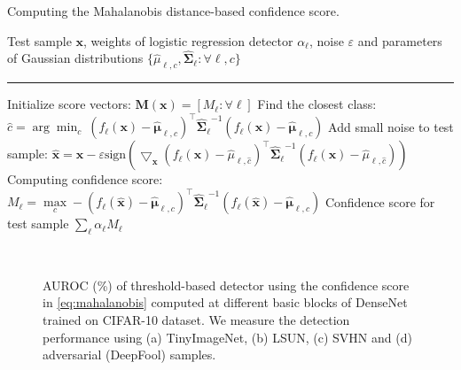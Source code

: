 \documentclass{article}
\begin{document}
\begin{algorithm}[t]
\caption{Computing the Mahalanobis distance-based confidence score.} \label{alg:computing_mahalanobis}
\begin{algorithmic}
 Test sample $\mathbf{x}$, weights of logistic regression detector $\alpha_\ell$, noise $\varepsilon$ and parameters of Gaussian distributions $\{ {\widehat \mu}_{\ell,c}, \mathbf{\widehat \Sigma}_\ell: \forall \ell,c \}$
\vspace{0.05in}
\hrule
\vspace{0.05in}
\State Initialize score vectors: $\mathbf{M}(\mathbf{x}) = [M_\ell:\forall \ell]$
\State Find the closest class: $\widehat c = \arg \min_c ~(f_\ell(\mathbf{x}) - \mathbf{\widehat \mu}_{\ell,c})^\top \mathbf{\widehat \Sigma_\ell}^{-1} (f_\ell(\mathbf{x}) - \mathbf{\widehat \mu}_{\ell,c})$
\State Add small noise to test sample: $\mathbf{\widehat  x} = \mathbf{x} - \varepsilon \text{sign} \left( \bigtriangledown_{\mathbf{x}}
 \left( f_\ell(\mathbf{x}) - {\widehat \mu}_{\ell, \widehat c}\right)^\top \mathbf{\widehat \Sigma_\ell}^{-1} \left( f_\ell(\mathbf{x}) - {\widehat \mu}_{\ell,\widehat c}\right)  \right)$ 
\State  Computing confidence score: $M_\ell = \max \limits_c  - \left(f_\ell(\mathbf{\widehat x}) - \mathbf{\widehat \mu}_{\ell,c}\right)^\top \mathbf{\widehat \Sigma_\ell}^{-1} \left(f_\ell(\mathbf{\widehat x}) - \mathbf{\widehat \mu}_{\ell, c}\right)$
\EndFor
\State \Return Confidence score for test sample {$\sum_{\ell} \alpha_\ell M_\ell$}
\end{algorithmic}
\end{algorithm}


\begin{figure} [t] \centering
{} 
\,
\,
\,
\caption{AUROC (\%) of threshold-based detector using the confidence score in \eqref{eq:mahalanobis} computed at different basic blocks of DenseNet trained on CIFAR-10 dataset. We measure the detection performance using (a) TinyImageNet, (b) LSUN, (c) SVHN and (d) adversarial (DeepFool) samples.}
\label{fig:low_layer_dense}
\end{figure}
\end{document}
